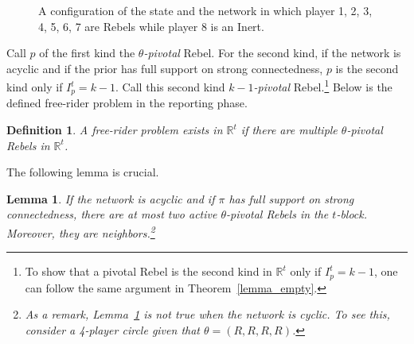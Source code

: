 \documentclass[12pt,letter]{article}
\newcommand{\Omicron}{\mathbb{R}}
\newtheorem{lemma}{Lemma}[section]
\newtheorem{definition}{Definition}[section]
\theoremstyle{definition}
\theoremstyle{definition}
\theoremstyle{remark}
\theoremstyle{claim}
\begin{document}
\begin{figure}


\begin{center}
\end{center}
\caption{A configuration of the state and the network in which player 1, 2, 3, 4, 5, 6, 7 are Rebels while player 8 is an Inert.}
\label{fig:k-1_pivotal}
\end{figure}

Call $p$ of the first kind the \textit{$\theta$-pivotal} Rebel. For the second kind, if the network is acyclic and if the prior has full support on strong connectedness, $p$ is the second kind only if $I^{t}_p=k-1$. Call this second kind \textit{$k-1$-pivotal} Rebel.\footnote{To show that a pivotal Rebel is the second kind in $\Omicron^{t}$ only if $I^{t}_p=k-1$, one can follow the same argument in Theorem~\ref{lemma_empty}.} Below is the defined free-rider problem in the reporting phase.

\begin{definition}
A free-rider problem exists in $\Omicron^t$ if there are multiple $\theta$-pivotal Rebels in $\Omicron^t$.
\end{definition}



The following lemma is crucial. 
\begin{lemma}
\label{lemma_at_most_two_nodes}
If the network is acyclic and if $\pi$ has full support on strong connectedness, there are at most two active $\theta$-pivotal Rebels in the $t$-block. Moreover, they are neighbors.\footnote{As a remark, Lemma~\ref{lemma_at_most_two_nodes} is not true when the network is cyclic. To see this, consider a 4-player circle given that $\theta=(R,R,R,R)$.}
\end{lemma}
\end{document}
